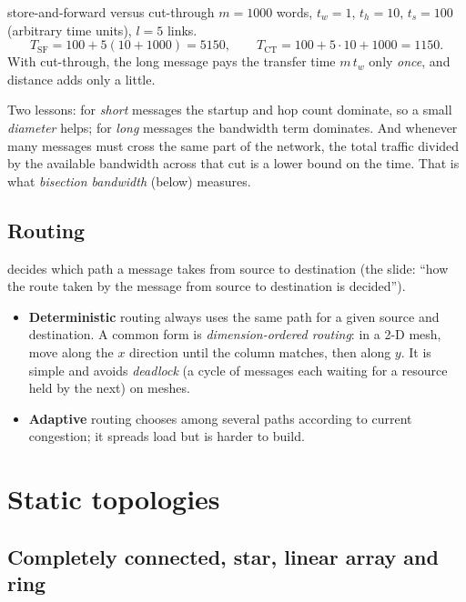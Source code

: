 \begin{workedex}{store-and-forward versus cut-through}
$m=1000$ words, $t_w=1$, $t_h=10$, $t_s=100$ (arbitrary time units), $l=5$ links.
\[
  T_{\text{SF}} = 100 + 5(10+1000) = 5150, \qquad T_{\text{CT}} = 100 + 5\cdot 10 + 1000 = 1150 .
\]
With cut-through, the long message pays the transfer time $m\,t_w$ only \emph{once}, and distance adds only a little.
\end{workedex}

Two lessons: for \emph{short} messages the startup and hop count dominate, so a small \emph{diameter} helps; for \emph{long}
messages the bandwidth term dominates. And whenever many messages must cross the same part of the network, the total traffic
divided by the available bandwidth across that cut is a lower bound on the time. That is what \emph{bisection bandwidth}
(below) measures.

\subsection{Routing}

 decides which path a message takes from source to destination (the slide: ``how the route taken by the message
from source to destination is decided'').
\begin{itemize}
  \item \textbf{Deterministic} routing always uses the same path for a given source and destination. A common form is
        \emph{dimension-ordered routing}: in a 2-D mesh, move along the $x$ direction until the column matches, then along $y$.
        It is simple and avoids \emph{deadlock} (a cycle of messages each waiting for a resource held by the next) on meshes.
  \item \textbf{Adaptive} routing chooses among several paths according to current congestion; it spreads load but is harder to build.
\end{itemize}

\section{Static topologies}

\subsection{Completely connected, star, linear array and ring}

